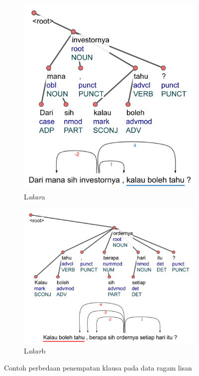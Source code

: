 \documentclass[10pt, a4paper, conference, compsocconf]{IEEEtran}
\begin{document}
\begin{figure}
\centering

\begin{subfigure}{.4\linewidth}
  \centering
  \includegraphics[width=1\linewidth] {pics/ls1436.jpg} 
	\caption{L\textit{akar}a}
	\label{fig:ls1436} 
\end{subfigure}
%
\begin{subfigure}{.58\linewidth}
  \centering
  \includegraphics[width=1\linewidth]{pics/ls1460.jpg} 
	\caption{L\textit{akar}b}
	\label{fig:ls1460} 
\end{subfigure}

\caption{Contoh perbedaan penempatan klausa pada data ragam lisan}
\label{fig:akarcontoh}
\end{figure}
\end{document}
